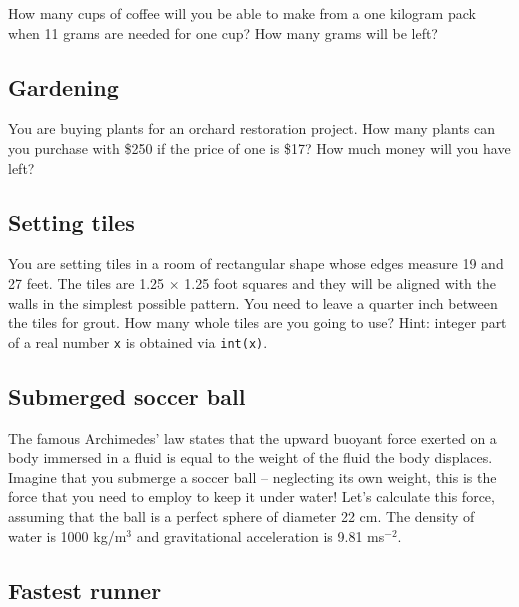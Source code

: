 How many cups of coffee will you be able to make from a one kilogram
pack when 11 grams are needed for one cup? How many grams will be 
left?


\subsection{Gardening}

You are buying plants for an orchard restoration project.
How many plants can you purchase with \$250 if the price 
of one is \$17? How much money will you have left?  


\subsection{Setting tiles}

You are setting tiles in a room of rectangular shape whose edges measure 19 and 27 feet. 
The tiles are 1.25 $\times$ 1.25 foot squares and they will be aligned with the walls
in the simplest possible pattern. You need 
to leave a quarter inch between the tiles for grout. How many whole tiles are you going to use?
Hint: integer part of a real number {\tt x} is obtained via {\tt int(x)}.


\subsection{Submerged soccer ball}

The famous Archimedes' law states that the upward buoyant force exerted on a body 
immersed in a fluid is equal to the weight of the fluid the body displaces.
Imagine that you submerge a soccer ball -- neglecting its own weight, this 
is the force that you need to employ to keep it under water! Let's calculate 
this force, assuming that the ball is a perfect sphere of diameter 22 cm.
The density of water is 1000 kg/m${^3}$ and gravitational acceleration 
is 9.81 ms${^{-2}}$. 


\subsection{Fastest runner}

